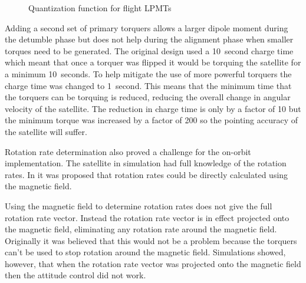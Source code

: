 \begin{figure}[htb!]
    \centering
    \caption{Quantization function for flight \acsp{LPMT}}
    \label{fig:lpmtq-flt}
\end{figure}

Adding a second set of primary torquers allows a larger dipole moment during the detumble phase but does not help during the alignment phase when smaller torques need to be generated. The original design used a 10~second charge time which meant that once a torquer was flipped it would be torquing the satellite for a minimum 10~seconds. To help mitigate the use of more powerful torquers the charge time was changed to 1~second. This means that the minimum time that the torquers can be torquing is reduced, reducing the overall change in angular velocity of the satellite. The reduction in charge time is only by a factor of 10 but the minimum torque was increased by a factor of 200 so the pointing accuracy of the satellite will suffer.

Rotation rate determination also proved a challenge for the on-orbit implementation. The satellite in simulation had full knowledge of the rotation rates. In \cite{Mentch11} it was proposed that rotation rates could be directly calculated using the magnetic field. 

Using the magnetic field to determine rotation rates does not give the full rotation rate vector. Instead the rotation rate vector is in effect projected onto the magnetic field, eliminating any rotation rate around the magnetic field. Originally it was believed that this would not be a problem because the torquers can't be used to stop rotation around the magnetic field. Simulations showed, however, that when the rotation rate vector was projected onto the magnetic field then the attitude control did not work.

